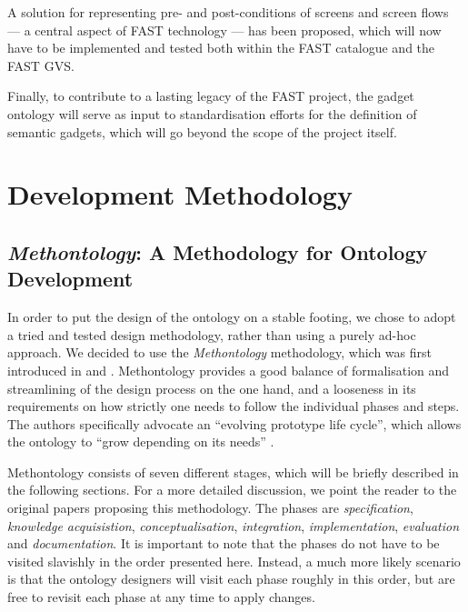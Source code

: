 \documentclass{fast_latex}
\begin{document}
A solution for representing pre- and post-conditions of screens and screen flows --- a central aspect of FAST technology --- has been proposed, which will now have to be implemented and tested both within the FAST catalogue and the FAST GVS.

Finally, to contribute to a lasting legacy of the FAST project, the gadget ontology will serve as input to standardisation efforts for the definition of semantic gadgets, which will go beyond the scope of the project itself.

% 

\clearpage
{}
\appendix

\section{Development Methodology}

\subsection{\emph{Methontology}: A Methodology for Ontology Development} %
\label{sub:methontology_a_methodology_for_ontology_development}

In order to put the design of the ontology on a stable footing, we chose to adopt a tried and tested design methodology, rather than using a purely ad-hoc approach. We decided to use the \emph{Methontology} methodology, which was first introduced in \cite{gomez_perez1996conceptualise_ontologies} and \cite{fernandez1997methontology}. Methontology provides a good balance of formalisation and streamlining of the design process on the one hand, and a looseness in its requirements on how strictly one needs to follow the individual phases and steps. The authors specifically advocate an ``evolving prototype life cycle'', which allows the ontology to ``grow depending on its needs'' \cite{fernandez1997methontology}.

Methontology consists of seven different stages, which will be briefly described in the following sections. For a more detailed discussion, we point the reader to the original papers proposing this methodology. The phases are \emph{specification}, \emph{knowledge acquisistion}, \emph{conceptualisation}, \emph{integration}, \emph{implementation}, \emph{evaluation} and \emph{documentation}. It is important to note that the phases do not have to be visited slavishly in the order presented here. Instead, a much more likely scenario is that the ontology designers will visit each phase roughly in this order, but are free to revisit each phase at any time to apply changes.
\end{document}
